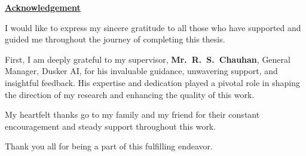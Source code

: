 \thispagestyle{plain}
\doublespacing

\begin{center}
{\Large\bfseries\underline{Acknowledgement}}
\end{center}

\vspace{10mm}

I would like to express my sincere gratitude to all those who have
supported and guided me throughout the journey of completing this
thesis.

First, I am deeply grateful to my supervisor, \textbf{Mr.\ R.\ S.\
Chauhan}, General Manager, Dusker AI, for his invaluable guidance,
unwavering support, and insightful feedback. His expertise and
dedication played a pivotal role in shaping the direction of my
research and enhancing the quality of this work.

My heartfelt thanks go to my family and my friend  for their constant encouragement and steady support throughout this work.

Thank you all for being a part of this fulfilling endeavor.

\clearpage
